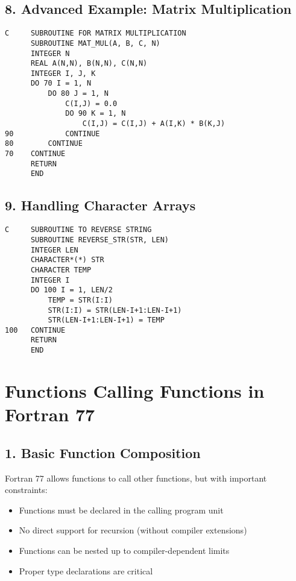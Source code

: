 \documentclass{book}
\begin{document}
\subsection*{8. Advanced Example: Matrix Multiplication}
\begin{verbatim}
C     SUBROUTINE FOR MATRIX MULTIPLICATION
      SUBROUTINE MAT_MUL(A, B, C, N)
      INTEGER N
      REAL A(N,N), B(N,N), C(N,N)
      INTEGER I, J, K
      DO 70 I = 1, N
          DO 80 J = 1, N
              C(I,J) = 0.0
              DO 90 K = 1, N
                  C(I,J) = C(I,J) + A(I,K) * B(K,J)
90            CONTINUE
80        CONTINUE
70    CONTINUE
      RETURN
      END
\end{verbatim}

\subsection*{9. Handling Character Arrays}
\begin{verbatim}
C     SUBROUTINE TO REVERSE STRING
      SUBROUTINE REVERSE_STR(STR, LEN)
      INTEGER LEN
      CHARACTER*(*) STR
      CHARACTER TEMP
      INTEGER I
      DO 100 I = 1, LEN/2
          TEMP = STR(I:I)
          STR(I:I) = STR(LEN-I+1:LEN-I+1)
          STR(LEN-I+1:LEN-I+1) = TEMP
100   CONTINUE
      RETURN
      END
\end{verbatim}

\section{Functions Calling Functions in Fortran 77}

\subsection*{1. Basic Function Composition}
Fortran 77 allows functions to call other functions, but with important constraints:
\begin{itemize}
\item Functions must be declared in the calling program unit
\item No direct support for recursion (without compiler extensions)
\item Functions can be nested up to compiler-dependent limits
\item Proper type declarations are critical
\end{itemize}
\end{document}
